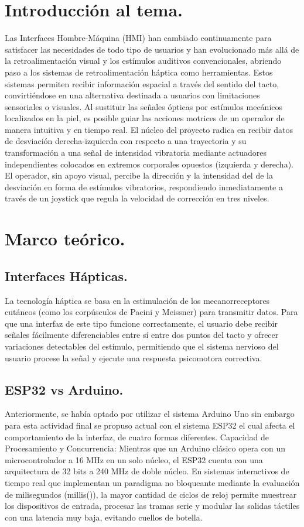 \documentclass[conference]{IEEEtran}
\begin{document}

\section{Introducción al tema.}
Las Interfaces Hombre-Máquina (HMI) han cambiado continuamente para satisfacer las necesidades de todo tipo de usuarios y han evolucionado más allá de la retroalimentación visual y los estímulos auditivos convencionales, abriendo paso a los sistemas de retroalimentación háptica como herramientas. Estos sistemas permiten recibir información espacial a través del sentido del tacto, convirtiéndose en una alternativa destinada a usuarios con limitaciones sensoriales o visuales. Al sustituir las señales ópticas por estímulos mecánicos localizados en la piel, es posible guiar las acciones motrices de un operador de manera intuitiva y en tiempo real.
El núcleo del proyecto radica en recibir datos de desviación derecha-izquierda con respecto a una trayectoria y su transformación a una señal de intensidad vibratoria mediante actuadores independientes colocados en extremos corporales opuestos (izquierda y derecha). El operador, sin apoyo visual, percibe la dirección y la intensidad del de la desviación en forma de estímulos vibratorios, respondiendo inmediatamente a través de un joystick que regula la velocidad de corrección en tres niveles.

\section{Marco teórico.}
  \subsection{Interfaces Hápticas.}
  La tecnología háptica se basa en la estimulación de los mecanorreceptores cutáneos (como los corpúsculos de Pacini y Meissner) para transmitir datos. Para que una interfaz de este tipo funcione correctamente, el usuario debe recibir señales fácilmente diferenciables entre sí entre dos puntos del tacto y ofrecer variaciones detectables del estímulo, permitiendo que el sistema nervioso del usuario procese la señal y ejecute una respuesta psicomotora correctiva.

  \subsection{ESP32 vs Arduino.}
  Anteriormente, se había optado por utilizar el sistema Arduino Uno sin embargo para esta actividad final se propuso actual con el sistema ESP32 el cual afecta el comportamiento de la interfaz, de cuatro formas diferentes.
Capacidad de Procesamiento y Concurrencia: Mientras que un Arduino clásico opera con un microcontrolador a 16 MHz en un solo núcleo, el ESP32 cuenta con una arquitectura de 32 bits a 240 MHz de doble núcleo. En sistemas interactivos de tiempo real que implementan un paradigma no bloqueante mediante la evaluación de milisegundos (millis()), la mayor cantidad de ciclos de reloj permite muestrear los dispositivos de entrada, procesar las tramas serie y modular las salidas táctiles con una latencia muy baja, evitando cuellos de botella.
\end{document}
